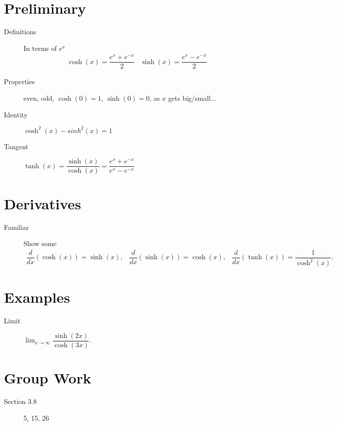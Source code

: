\documentclass[11pt]{article}
\newcommand{\ds}{\displaystyle}
\begin{document}
\drawtitle

\section*{Preliminary}
\begin{description}
\item[Definitions] In terms of $e^x$
  \[
  \begin{array}{cc}
    \cosh(x)=\dfrac{e^x+e^{-x}}{2} & \sinh(x)=\dfrac{e^x-e^{-x}}{2}
  \end{array}
  \]
\item[Properties] even, odd, $\cosh(0)=1$, $\sinh(0)=0$, as $x$ gets
  big/small...
\item[Identity] $\cosh^2(x)-sinh^2(x)=1$
\item[Tangent] $\tanh(x)=\dfrac{\sinh(x)}{\cosh(x)}=
  \dfrac{e^x+e^{-x}}{e^x-e^{-x}}$
\end{description}

\section*{Derivatives}
\begin{description}
\item[Familiar] Show some
  \[
  \begin{array}{ccc}
    \dfrac{d}{dx}(\cosh(x))=\sinh(x), & \dfrac{d}{dx}(\sinh(x))= \cosh(x),
    & \dfrac{d}{dx}(\tanh(x))=\dfrac{1}{\cosh^2(x)}.
  \end{array}
  \]
\end{description}

\section*{Examples}
\begin{description}
\item[Limit] $\ds\lim_{x\rightarrow\infty}\dfrac{\sinh(2x)}{\cosh(3x)}$.
\end{description}

\section*{Group Work}
\begin{description}
\item[Section 3.8] 5, 15, 26
\end{description}
\end{document}
